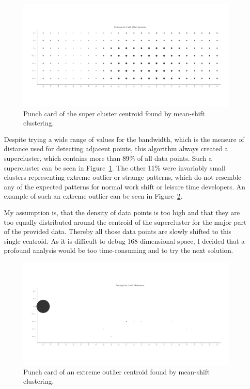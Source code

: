 \begin{figure}[h]
    \includegraphics[scale=0.32]{./graphs/analysis-mean-shift/supercluster}
    \centering
    \caption{Punch card of the super cluster centroid found by mean-shift clustering.}\label{fig:mean-shift-super-cluster}
\end{figure}

Despite trying a wide range of values for the bandwidth, which is the measure of distance used for detecting adjacent points, this algorithm always created a supercluster, which contains more than 89\% of all data points.
Such a supercluster can be seen in Figure~\ref{fig:mean-shift-super-cluster}.
The other 11\% were invariably small clusters representing extreme outlier or strange patterns, which do not resemble any of the expected patterns for normal work shift or leisure time developers.
An example of such an extreme outlier can be seen in Figure~\ref{fig:mean-shift-outlier}.

My assumption is, that the density of data points is too high and that they are too equally distributed around the centroid of the supercluster for the major part of the provided data.
Thereby all those data points are slowly shifted to this single centroid.
As it is difficult to debug 168-dimensional space, I decided that a profound analysis would be too time-consuming and to try the next solution.

\begin{figure}[h]
    \includegraphics[scale=0.32]{./graphs/analysis-mean-shift/outlier}
    \centering
    \caption{Punch card of an extreme outlier centroid found by mean-shift clustering.}\label{fig:mean-shift-outlier}
\end{figure}

